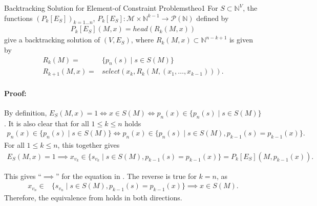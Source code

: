 \begin{theorem}{Backtracking Solution for Element-of Constraint Problems}{theo1}
    For $S\subset\mathbb N^V$, the functions $(P_k[E_S])_{k=1\dots n}$,
    $P_k[E_S]\colon\mathcal M\times\mathbb N^{k-1}\rightarrow\mathcal P(\mathbb N)$
    defined by
    \begin{align*}
        P_k[E_S](M,x)=head(R_k(M,x))
    \end{align*}
    give a backtracking solution of $(V,E_S)$, where
    $R_k(M,x)\subset\mathbb N^{n-k+1}$ is given by
    \begin{align*}
        R_k(M)={}&\{p_n(s)\mid s\in S(M)\}\\
        R_{k+1}(M,x)={}&select(x_k,R_k(M,(x_1,\dots,x_{k-1}))).
    \end{align*}
    \tcblower
    \paragraph*{Proof:} By definition,
    $E_S(M,x)=1\iff x\in S(M)\iff p_n(x)\in\{p_n(s)\mid s\in S(M)\}$.
    It is also clear that for all $1\leq k\leq n$ holds
    \begin{align*}
        p_n(x)\in\{p_n(s)\mid s\in S(M)\}\iff p_n(x)\in\{p_n(s)\mid s\in S(M),p_{k-1}(s)=p_{k-1}(x)\}.
    \end{align*}
    For all $1\leq k\leq n$, this together gives
    \begin{align*}
        E_S(M,x)=1\implies x_{v_k}\in\{s_{v_k}\mid s\in S(M),p_{k-1}(s)=p_{k-1}(x)\}=P_k[E_S](M,p_{k-1}(x)).
    \end{align*}

    This gives ``$\implies$'' for the equation in .
    The reverse is true for $k=n$, as
    \begin{align*}
        x_{v_n}\in{}&\{s_{v_n}\mid s\in S(M),p_{k-1}(s)=p_{k-1}(x)\}\implies x\in S(M).
    \end{align*}
    Therefore, the equivalence from  holds in both directions.
\end{theorem}
